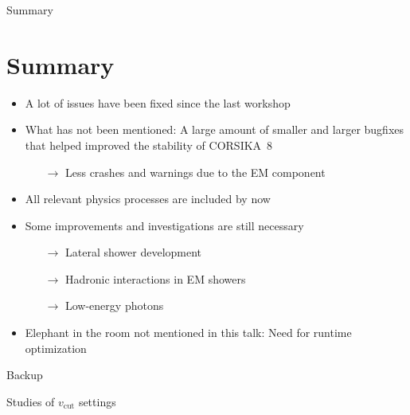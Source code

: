 \documentclass[aspectratio=1610, 9pt]{beamer}
\begin{document}
\begin{frame}
  \begin{center}
    \Huge Summary
  \end{center}
\end{frame}

\section{Summary}

\begin{frame}

    \begin{itemize}
      \item A lot of issues have been fixed since the last workshop
      \item What has not been mentioned: A large amount of smaller and larger bugfixes that helped improved the stability of CORSIKA~8
      \begin{itemize}
        \item[$\rightarrow$] Less crashes and warnings due to the EM component 
      \end{itemize}
      \item All relevant physics processes are included by now
      \item Some improvements and investigations are still necessary
      \begin{itemize}
        \item[$\rightarrow$] Lateral shower development
        \item[$\rightarrow$] Hadronic interactions in EM showers
        \item[$\rightarrow$] Low-energy photons
      \end{itemize}
      \item Elephant in the room not mentioned in this talk: Need for runtime optimization 
    \end{itemize}
\end{frame}


\appendix

\begin{frame}
  \begin{center}
    \Huge Backup
  \end{center}
\end{frame}


\begin{frame}
  \begin{center}
    \Huge Studies of $v_\text{cut}$ settings
  \end{center}
\end{frame}
\end{document}
